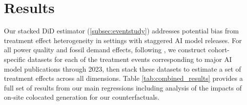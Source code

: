 \documentclass[a4paper,fleqn,longmktitle]{cas-sc}
\newcommand{\nb}[1]{\textcolor{blue}{NB[#1]}}
\begin{document}



\section{Results}\label{Sec::Results}
Our stacked DiD estimator (\autoref{subsec:eventstudy}) addresses potential bias from treatment effect heterogeneity in settings with staggered AI model releases. For all power quality and fossil demand effects, following \citet{callaway2021difference}, we construct cohort-specific datasets for each of the treatment events corresponding to major AI model publications through 2023, then stack these datasets to estimate a set of treatment effects across all dimensions. Table \ref{tab:combined_results} provides a full set of results from our main regressions including analysis of the impacts of on-site colocated generation for our counterfactuals.
\end{document}
